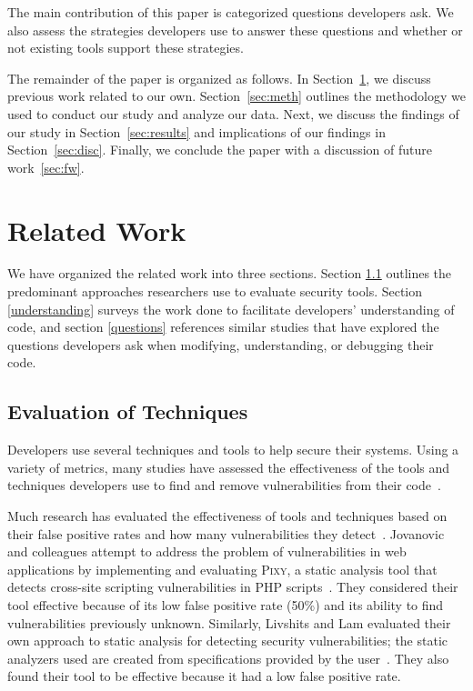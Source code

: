 \documentclass[conference]{IEEEtran}
\begin{document}
The main contribution of this paper is categorized questions developers ask. 
We also assess the strategies developers use to answer these questions and whether or not existing tools support these strategies.

The remainder of the paper is organized as follows. 
In Section~\ref{sec:rw}, we discuss previous work related to our own. 
Section~\ref{sec:meth} outlines the methodology we used to conduct our study and analyze our data. 
Next, we discuss the findings of our study in Section~\ref{sec:results} and implications of our findings in Section~\ref{sec:disc}. 
Finally, we conclude the paper with a discussion of future work~\ref{sec:fw}.



\section{Related Work}
\label{sec:rw}

We have organized the related work into three sections. Section \ref{evaluation} outlines the predominant approaches researchers use to evaluate security tools. 
Section \ref{understanding} surveys the work done to facilitate developers' understanding of code, and section \ref{questions} references similar studies that have explored the questions developers ask when modifying, understanding, or debugging their code.

\subsection{Evaluation of Techniques}
\label{evaluation}
Developers use several techniques and tools to help secure their systems.
Using a variety of metrics, many studies have assessed the effectiveness of the tools and techniques developers use to find and remove vulnerabilities from their code~\cite{martin2005finding, austin2011one, livshits2005finding}.  

Much research has evaluated the effectiveness of tools and techniques based on their false positive rates and how many vulnerabilities they detect~\cite{jovanovic2006pixy, austin2011one, dukes2013case}. 
Jovanovic and colleagues attempt to address the problem of vulnerabilities in web applications by implementing and evaluating \textsc{Pixy}, a static analysis tool that detects cross-site scripting vulnerabilities in PHP scripts~\cite{jovanovic2006pixy}. 
They considered their tool effective because of its low false positive rate (50\%) and its ability to find vulnerabilities previously unknown. 
Similarly, Livshits and Lam evaluated their own approach to static analysis for detecting security vulnerabilities; the static analyzers used are created from specifications provided by the user~\cite{livshits2005finding}. 
They also found their tool to be effective because it had a low false positive rate. 
\end{document}
